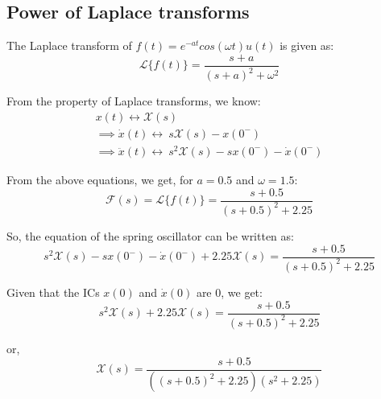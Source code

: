 \documentclass[11pt, a4paper, twoside]{article}
\begin{document}
    \subsection{Power of Laplace transforms}
        The Laplace transform of $f(t) = e^{-at}cos(\omega t)u(t)$ is given as:
        \begin{equation*}
            \mathcal{L}\{f(t)\} = \frac{s+a}{(s+a)^2 + \omega^2}
        \end{equation*}
            
        From the property of Laplace transforms, we know:
        \begin{gather*}
            x(t) \longleftrightarrow \mathcal{X}(s)\\
            \implies \dot{x}(t) \longleftrightarrow \ s\mathcal{X}(s) - x(0^-)\\
            \implies \ddot{x}(t) \longleftrightarrow \ s^2\mathcal{X}(s) - sx(0^-)-\dot{x}(0^-)
        \end{gather*}
            
        From the above equations, we get, for $a = 0.5$ and $\omega = 1.5$:
        \begin{equation*}
            \mathcal{F}(s) = \mathcal{L}\{f(t)\} = \frac{s+0.5}{(s+0.5)^2+2.25}
        \end{equation*}
            
        So, the equation of the spring oscillator can be written as:
        \begin{equation*}
            s^2\mathcal{X}(s) - sx(0^-)-\dot{x}(0^-) + 2.25\mathcal{X}(s) = \frac{s+0.5}{(s+0.5)^2+2.25}
        \end{equation*}
        
        Given that the ICs $x(0)$ and $\dot{x}(0)$ are 0, we get:
        \begin{equation*}
            s^2\mathcal{X}(s) + 2.25\mathcal{X}(s) = \frac{s+0.5}{(s+0.5)^2+2.25}
        \end{equation*}
        
        or,
        \begin{equation*}
            \mathcal{X}(s) = \frac{s+0.5}{((s+0.5)^2+2.25)(s^2+2.25)}
        \end{equation*}
        
\end{document}
